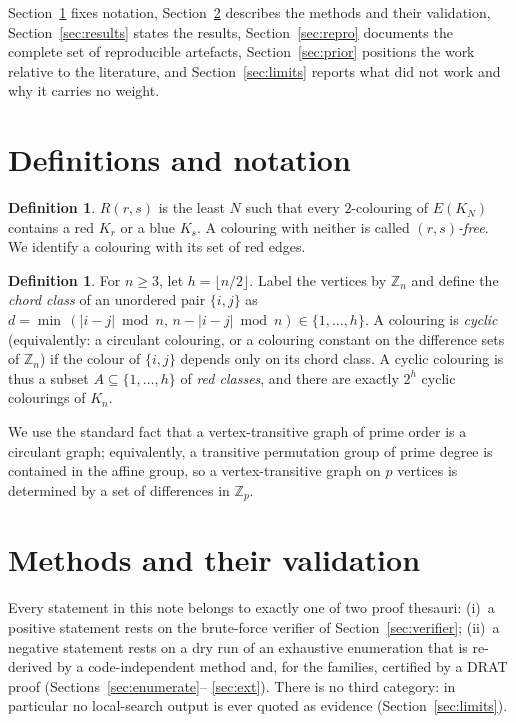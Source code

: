 \documentclass[11pt]{article}
\theoremstyle{definition}
\newtheorem{definition}[theorem]{Definition}
\theoremstyle{plain}
\newcommand{\K}{\ensuremath{K}}
\newcommand{\Zn}{\ensuremath{\mathbb{Z}_n}}
\newcommand{\Zp}{\ensuremath{\mathbb{Z}_p}}
\begin{document}
Section~\ref{sec:defs} fixes notation, Section~\ref{sec:methods} describes the
methods and their validation, Section~\ref{sec:results} states the results,
Section~\ref{sec:repro} documents the complete set of reproducible artefacts,
Section~\ref{sec:prior} positions the work relative to the literature, and
Section~\ref{sec:limits} reports what did not work and why it carries no
weight.

\section{Definitions and notation}\label{sec:defs}

\begin{definition}
$R(r,s)$ is the least $N$ such that every $2$-colouring of $E(\K_N)$ contains a
red $\K_r$ or a blue $\K_s$. A colouring with neither is called
\emph{$(r,s)$-free}. We identify a colouring with its set of red edges.
\end{definition}

\begin{definition}
For $n \ge 3$, let $h = \lfloor n/2 \rfloor$. Label the vertices by
$\Zn$ and define the \emph{chord class} of an unordered pair $\{i,j\}$ as
$d = \min\,(|i-j| \bmod n,\, n - |i-j| \bmod n) \in \{1,\dots,h\}$. A colouring
is \emph{cyclic} (equivalently: a circulant colouring, or a colouring
constant on the difference sets of $\Zn$) if the colour of $\{i,j\}$ depends
only on its chord class. A cyclic colouring is thus a subset
$A \subseteq \{1,\dots,h\}$ of \emph{red classes}, and there are exactly
$2^{h}$ cyclic colourings of $\K_n$.
\end{definition}

We use the standard fact that a vertex-transitive graph of prime order is a
circulant graph; equivalently, a transitive permutation group of prime degree
is contained in the affine group, so a vertex-transitive graph on $p$ vertices
is determined by a set of differences in $\Zp$.

\section{Methods and their validation}\label{sec:methods}

Every statement in this note belongs to exactly one of two proof thesauri:
(i)~a positive statement rests on the brute-force verifier of
Section~\ref{sec:verifier}; (ii)~a negative statement rests on a dry run of
an exhaustive enumeration that is re-derived by a code-independent method and,
for the families, certified by a DRAT proof (Sections~\ref{sec:enumerate}--
\ref{sec:ext}). There is no third category: in particular no local-search
output is ever quoted as evidence (Section~\ref{sec:limits}).
\end{document}
